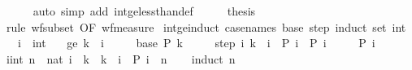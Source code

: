 \begin{isabellebody}
\ \ \ \ \isamarkupfalse%
\ {\isacharparenleft}{\kern0pt}auto\ simp\ add{\isacharcolon}{\kern0pt}\ int{\isacharunderscore}{\kern0pt}ge{\isacharunderscore}{\kern0pt}less{\isacharunderscore}{\kern0pt}than{}{\isacharunderscore}{\kern0pt}def{\isacharparenright}{\kern0pt}\isanewline
\ \ \isamarkupfalse%
\ \isamarkupfalse%
\ {\isacharquery}{\kern0pt}thesis\isanewline
\ \ \ \ \isamarkupfalse%
\ {\isacharparenleft}{\kern0pt}rule\ wf{\isacharunderscore}{\kern0pt}subset\ {\isacharbrackleft}{\kern0pt}OF\ wf{\isacharunderscore}{\kern0pt}measure{\isacharbrackright}{\kern0pt}{\isacharparenright}{\kern0pt}\isanewline
{}\isamarkupfalse%
%
\endisatagproof
{\isafoldproof}%
%
\isadelimproof
\isanewline
%
\endisadelimproof
\isanewline
\isanewline
{}\isamarkupfalse%
\ int{\isacharunderscore}{\kern0pt}ge{\isacharunderscore}{\kern0pt}induct\ {\isacharbrackleft}{\kern0pt}case{\isacharunderscore}{\kern0pt}names\ base\ step{\isacharcomma}{\kern0pt}\ induct\ set{\isacharcolon}{\kern0pt}\ int{\isacharbrackright}{\kern0pt}{\isacharcolon}{\kern0pt}\isanewline
\ \ \ i\ {\isacharcolon}{\kern0pt}{\isacharcolon}{\kern0pt}\ int\isanewline
\ \ \ ge{\isacharcolon}{\kern0pt}\ {\isachardoublequoteopen}k\ {\isasymle}\ i{\isachardoublequoteclose}\isanewline
\ \ \ \ \ base{\isacharcolon}{\kern0pt}\ {\isachardoublequoteopen}P\ k{\isachardoublequoteclose}\isanewline
\ \ \ \ \ step{\isacharcolon}{\kern0pt}\ {\isachardoublequoteopen}{\isasymAnd}i{\isachardot}{\kern0pt}\ k\ {\isasymle}\ i\ {\isasymLongrightarrow}\ P\ i\ {\isasymLongrightarrow}\ P\ {\isacharparenleft}{\kern0pt}i\ {\isacharplus}{\kern0pt}\ {}{\isacharparenright}{\kern0pt}{\isachardoublequoteclose}\isanewline
\ \ \ {\isachardoublequoteopen}P\ i{\isachardoublequoteclose}\isanewline
%
\isadelimproof
%
\endisadelimproof
%
\isatagproof
{}\isamarkupfalse%
\ {\isacharminus}{\kern0pt}\isanewline
\ \ \isamarkupfalse%
\ {\isachardoublequoteopen}{\isasymAnd}i{\isacharcolon}{\kern0pt}{\isacharcolon}{\kern0pt}int{\isachardot}{\kern0pt}\ n\ {\isacharequal}{\kern0pt}\ nat\ {\isacharparenleft}{\kern0pt}i\ {\isacharminus}{\kern0pt}\ k{\isacharparenright}{\kern0pt}\ {\isasymLongrightarrow}\ k\ {\isasymle}\ i\ {\isasymLongrightarrow}\ P\ i{\isachardoublequoteclose}\ \ n\isanewline
\ \ \isamarkupfalse%
\ {\isacharparenleft}{\kern0pt}induct\ n{\isacharparenright}{\kern0pt}\isanewline
\ \ \ \ \isamarkupfalse%

\end{isabellebody}
